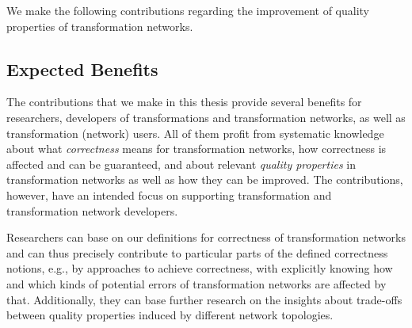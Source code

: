 We make the following contributions regarding the improvement of quality properties of transformation networks.
\begin{contributions}
\end{contributions}


\subsection{Expected Benefits}
\label{chap:introduction:objective:benefits}

The contributions that we make in this thesis provide several benefits for researchers, developers of transformations and transformation networks, as well as transformation (network) users.
All of them profit from systematic knowledge about what \emph{correctness} means for transformation networks, how correctness is affected and can be guaranteed, and about relevant \emph{quality properties} in transformation networks as well as how they can be improved.
The contributions, however, have an intended focus on supporting transformation and transformation network developers. 

Researchers can base on our definitions for correctness of transformation networks and can thus precisely contribute to particular parts of the defined correctness notions, e.g., by approaches to achieve correctness, with explicitly knowing how and which kinds of potential errors of transformation networks are affected by that.
Additionally, they can base further research on the insights about trade-offs between quality properties induced by different network topologies.

